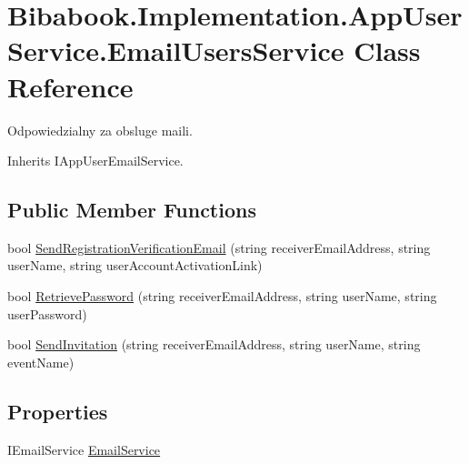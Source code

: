 \hypertarget{class_bibabook_1_1_implementation_1_1_app_user_service_1_1_email_users_service}{}\section{Bibabook.\+Implementation.\+App\+User\+Service.\+Email\+Users\+Service Class Reference}
\label{class_bibabook_1_1_implementation_1_1_app_user_service_1_1_email_users_service}


Odpowiedzialny za obsluge maili.  




Inherits I\+App\+User\+Email\+Service.

\subsection*{Public Member Functions}
\begin{DoxyCompactItemize}
\item 
bool \hyperlink{class_bibabook_1_1_implementation_1_1_app_user_service_1_1_email_users_service_afb5f83afe95be103c75dafad43a34fa7}{Send\+Registration\+Verification\+Email} (string receiver\+Email\+Address, string user\+Name, string user\+Account\+Activation\+Link)
\item 
bool \hyperlink{class_bibabook_1_1_implementation_1_1_app_user_service_1_1_email_users_service_a082e5666d6f2f5f08b51ae0644097fc7}{Retrieve\+Password} (string receiver\+Email\+Address, string user\+Name, string user\+Password)
\item 
bool \hyperlink{class_bibabook_1_1_implementation_1_1_app_user_service_1_1_email_users_service_ad05dcbb5e06b768a65373b44a39d0167}{Send\+Invitation} (string receiver\+Email\+Address, string user\+Name, string event\+Name)
\end{DoxyCompactItemize}
\subsection*{Properties}
\begin{DoxyCompactItemize}
\item 
I\+Email\+Service \hyperlink{class_bibabook_1_1_implementation_1_1_app_user_service_1_1_email_users_service_a9d0e2425374cd78f72ff2c959739fe86}{Email\+Service}
\end{DoxyCompactItemize}


